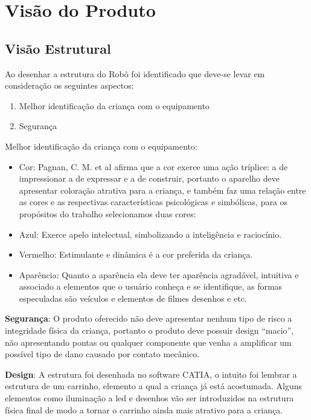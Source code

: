 \chapter[Visão do Produto]{Visão do Produto}

\section{Visão Estrutural}

Ao desenhar a estrutura do Robô foi identificado que deve-se levar em consideração os seguintes aspectos:
\begin{enumerate}
	\item Melhor identificação da criança com o equipamento
	\item Segurança
\end{enumerate}

Melhor identificação da criança com o equipamento:
\begin{itemize}
\item Cor: Pagnan, C. M. et al afirma que a cor exerce uma ação tríplice: a de impressionar a de expressar e a de construir, portanto o
aparelho deve apresentar coloração atrativa para a criança, e também faz uma relação entre as cores e as respectivas características
psicológicas e simbólicas, para os propósitos do trabalho selecionamos duas cores:
\item Azul: Exerce apelo intelectual, simbolizando a inteligência e raciocínio.
\item Vermelho: Estimulante e dinâmica é a cor preferida da criança.
\item Aparência: Quanto a aparência ela deve ter aparência agradável, intuitiva e associado a elementos que o usuário conheça e se
identifique, as formas especuladas são veículos e elementos de filmes desenhos e etc.
\end{itemize}

\textbf{Segurança}:
O produto oferecido não deve apresentar nenhum tipo de risco a integridade física da criança, portanto o produto deve possuir design
“macio”, não apresentando pontas ou qualquer componente que venha a amplificar um possível tipo de dano causado por contato mecânico.

\textbf{Design}:
A estrutura foi desenhada no software CATIA, o intuito foi lembrar a estrutura de um carrinho, elemento a qual a criança já está
acostumada. Alguns elementos como iluminação a led e desenhos vão ser introduzidos na estrutura física final de modo a tornar o
carrinho ainda mais atrativo para a criança.

